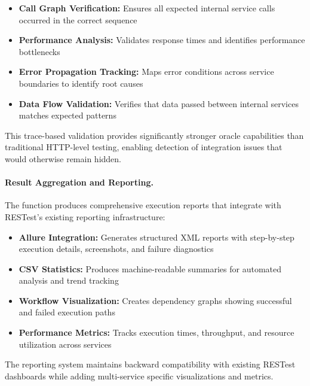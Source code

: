\begin{itemize}[leftmargin=*]
  \item \textbf{Call Graph Verification:} Ensures all expected
        internal service calls occurred in the correct sequence
  \item \textbf{Performance Analysis:} Validates response times
        and identifies performance bottlenecks
  \item \textbf{Error Propagation Tracking:} Maps error conditions
        across service boundaries to identify root causes
  \item \textbf{Data Flow Validation:} Verifies that data passed
        between internal services matches expected patterns
\end{itemize}

This trace-based validation provides significantly stronger oracle
capabilities than traditional HTTP-level testing, enabling detection
of integration issues that would otherwise remain hidden.

\paragraph{Result Aggregation and Reporting.}
The  function produces comprehensive execution
reports that integrate with RESTest's existing reporting infrastructure:

\begin{itemize}[leftmargin=*]
  \item \textbf{Allure Integration:} Generates structured XML reports
        with step-by-step execution details, screenshots, and
        failure diagnostics
  \item \textbf{CSV Statistics:} Produces machine-readable summaries
        for automated analysis and trend tracking
  \item \textbf{Workflow Visualization:} Creates dependency graphs
        showing successful and failed execution paths
  \item \textbf{Performance Metrics:} Tracks execution times,
        throughput, and resource utilization across services
\end{itemize}

The reporting system maintains backward compatibility with existing
RESTest dashboards while adding multi-service specific visualizations
and metrics.

